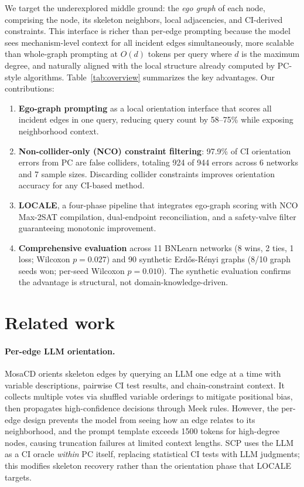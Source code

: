 \documentclass{article} %
\begin{document}
We target the underexplored middle ground: the \textit{ego graph} of each node, comprising the node, its skeleton neighbors, local adjacencies, and CI-derived constraints. This interface is richer than per-edge prompting because the model sees mechanism-level context for all incident edges simultaneously, more scalable than whole-graph prompting at $O(d)$ tokens per query where $d$ is the maximum degree, and naturally aligned with the local structure already computed by PC-style algorithms. Table~\ref{tab:overview} summarizes the key advantages. Our contributions:
\begin{enumerate}
    \item \textbf{Ego-graph prompting} as a local orientation interface that scores all incident edges in one query, reducing query count by 58--75\% while exposing neighborhood context.
    \item \textbf{Non-collider-only (NCO) constraint filtering}: 97.9\% of CI orientation errors from PC are false colliders, totaling 924 of 944 errors across 6 networks and 7 sample sizes. Discarding collider constraints improves orientation accuracy for any CI-based method.
    \item \textbf{LOCALE}, a four-phase pipeline that integrates ego-graph scoring with NCO Max-2SAT compilation, dual-endpoint reconciliation, and a safety-valve filter guaranteeing monotonic improvement.
    \item \textbf{Comprehensive evaluation} across 11 BNLearn networks (8 wins, 2 ties, 1 loss; Wilcoxon $p{=}0.027$) and 90 synthetic Erd\H{o}s-R\'{e}nyi graphs (8/10 graph seeds won; per-seed Wilcoxon $p{=}0.010$). The synthetic evaluation confirms the advantage is structural, not domain-knowledge-driven.
\end{enumerate}

\section{Related work}

\paragraph{Per-edge LLM orientation.}
MosaCD \citep{chen2024mosacd} orients skeleton edges by querying an LLM one edge at a time with variable descriptions, pairwise CI test results, and chain-constraint context. It collects multiple votes via shuffled variable orderings to mitigate positional bias, then propagates high-confidence decisions through Meek rules. However, the per-edge design prevents the model from seeing how an edge relates to its neighborhood, and the prompt template exceeds 1500 tokens for high-degree nodes, causing truncation failures at limited context lengths. SCP \citep{cohrs2024scp} uses the LLM as a CI oracle \textit{within} PC itself, replacing statistical CI tests with LLM judgments; this modifies skeleton recovery rather than the orientation phase that LOCALE targets.
\end{document}
